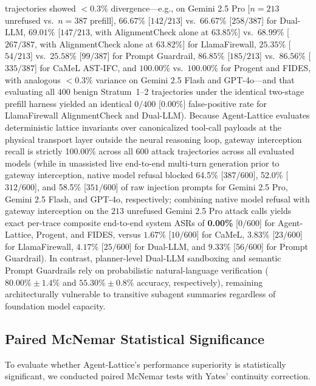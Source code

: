 \documentclass[conference,10pt]{IEEEtran}
\begin{document}
trajectories showed $< 0.3\%$ divergence---e.g., on Gemini 2.5 Pro [$n=213$ unrefused vs.\ $n=387$ prefill], $66.67\%$ [$142/213$] vs.\ $66.67\%$ [$258/387$] for Dual-LLM, $69.01\%$ [$147/213$, with AlignmentCheck alone at $63.85\%$] vs.\ $68.99\%$ [$267/387$, with AlignmentCheck alone at $63.82\%$] for LlamaFirewall, $25.35\%$ [$54/213$] vs.\ $25.58\%$ [$99/387$] for Prompt Guardrail, $86.85\%$ [$185/213$] vs.\ $86.56\%$ [$335/387$] for CaMeL AST-IFC, and $100.00\%$ vs.\ $100.00\%$ for Progent and FIDES, with analogous $< 0.3\%$ variance on Gemini 2.5 Flash and GPT-4o---and that evaluating all $400$ benign Stratum~1--2 trajectories under the identical two-stage prefill harness yielded an identical $0/400$ [$0.00\%$] false-positive rate for LlamaFirewall AlignmentCheck and Dual-LLM). Because Agent-Lattice evaluates deterministic lattice invariants over canonicalized tool-call payloads at the physical transport layer outside the neural reasoning loop, gateway interception recall is strictly 100.00\% across all 600 attack trajectories across all evaluated models (while in unassisted live end-to-end multi-turn generation prior to gateway interception, native model refusal blocked 64.5\% [$387/600$], 52.0\% [$312/600$], and 58.5\% [$351/600$] of raw injection prompts for Gemini 2.5 Pro, Gemini 2.5 Flash, and GPT-4o, respectively; combining native model refusal with gateway interception on the $213$ unrefused Gemini 2.5 Pro attack calls yields exact per-trace composite end-to-end system ASRs of \textbf{0.00\%} [$0/600$] for Agent-Lattice, Progent, and FIDES, versus $1.67\%$ [$10/600$] for CaMeL, $3.83\%$ [$23/600$] for LlamaFirewall, $4.17\%$ [$25/600$] for Dual-LLM, and $9.33\%$ [$56/600$] for Prompt Guardrail). In contrast, planner-level Dual-LLM sandboxing and semantic Prompt Guardrails rely on probabilistic natural-language verification ($80.00\% \pm 1.4\%$ and $55.30\% \pm 0.8\%$ accuracy, respectively), remaining architecturally vulnerable to transitive subagent summaries regardless of foundation model capacity.

\subsection{Paired McNemar Statistical Significance}
To evaluate whether Agent-Lattice's performance superiority is statistically significant, we conducted paired McNemar tests with Yates' continuity correction.
\end{document}
